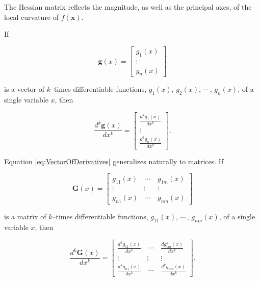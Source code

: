 \documentclass[graybox,envcountchap,sectrefs]{svmono}\usepackage[]{graphicx}\usepackage[]{xcolor}
\begin{document}
\begin{appendices}
The Hessian matrix reflects the magnitude, as well as the principal
axes, of the local curvature of $f\left(\mathrm{\mathbf{x}}\right)$.

If 

\begin{equation}
\mathrm{\mathbf{g}}\left(x\right)=\left[\begin{array}{c}
g_{1}\left(x\right)\\
\vdots\\
g_{n}\left(x\right)
\end{array}\right]\label{eq:VectorOfFunctions}
\end{equation}

is a vector of $k$--times differentiable functions, $g_{1}\left(x\right),\,g_{2}\left(x\right),\,\cdots\,,\,g_{n}\left(x\right)$,
of a single variable $x$, then 

\begin{equation}
\frac{d^{k}\mathrm{\mathbf{g}}\left(x\right)}{dx^{k}}=\left[\begin{array}{c}
\frac{d^{k}g_{1}\left(x\right)}{dx^{k}}\\
\vdots\\
\frac{d^{k}g_{n}\left(x\right)}{dx^{k}}
\end{array}\right].\label{eq:VectorOfDerivatives}
\end{equation}

Equation \eqref{eq:VectorOfDerivatives} generalizes naturally to
matrices. If 

\begin{equation}
\mathrm{\mathbf{G}}\left(x\right)=\left[\begin{array}{ccc}
g_{11}\left(x\right) & \,\cdots\, & g_{1m}\left(x\right)\\
\vdots & \vdots & \vdots\\
g_{n1}\left(x\right) & \,\cdots\, & g_{nm}\left(x\right)
\end{array}\right]\label{eq:MatrixOfFunctions}
\end{equation}

is a matrix of $k$--times differentiable functions, $g_{11}\left(x\right),\,\cdots\,,\,g_{nm}\left(x\right)$,
of a single variable $x$, then

\begin{equation}
\frac{d^{k}\mathrm{\mathbf{G}}\left(x\right)}{dx^{k}}=\left[\begin{array}{ccc}
\frac{d^{k}g_{11}\left(x\right)}{dx^{k}} & \,\cdots\, & \frac{dg_{1m}^{k}\left(x\right)}{dx^{k}}\\
\vdots & \vdots & \vdots\\
\frac{d^{k}g_{n1}\left(x\right)}{dx^{k}} & \,\cdots\, & \frac{d^{k}g_{nm}\left(x\right)}{dx^{k}}
\end{array}\right].\label{eq:MatrixOfDerivatives}
\end{equation}



\end{appendices}
\end{document}
